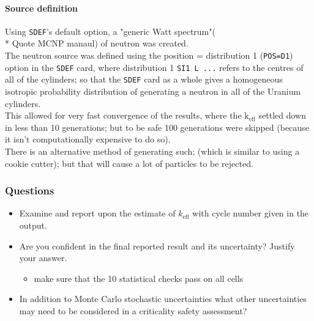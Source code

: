 \documentclass[a4paper, 12pt]{article}
\begin{document}
\paragraph{Source definition}
Using \texttt{SDEF}'s default option, a "generic Watt spectrum"(\\* Quote MCNP manaul) of neutron was created.
\\The neutron source was defined using the position = distribution 1 (\texttt{POS=D1}) option in the \texttt{SDEF} card, where distribution 1 \texttt{SI1 L ...} refers to the centres of all of the cylinders; so that the \texttt{SDEF} card as a whole gives a homogeneous isotropic probability distribution of generating a neutron in all of the Uranium cylinders.
\\This allowed for very fast convergence of the results, where the $\text{k}_{\text{eff}}$ settled down in less than 10 generations; but to be safe 100 generations were skipped (because it isn't computationally expensive to do so).
\\There is an alternative method of generating such; (which is similar to using a cookie cutter); but that will cause a lot of particles to be rejected.
\subsubsection{Questions}
\begin{itemize}
	\item Examine and report upon the estimate of $k_{\text{eff}}$ with cycle number given in the output.
	\item Are you confident in the final reported result and its uncertainty? Justify your answer.
	\begin{itemize}
		\item make sure that the 10 statistical checks pass on all cells
	\end{itemize}
	\item In addition to Monte Carlo stochastic uncertainties what other uncertainties may need 
	to be considered in a criticality safety assessment?
\end{itemize}
\end{document}
